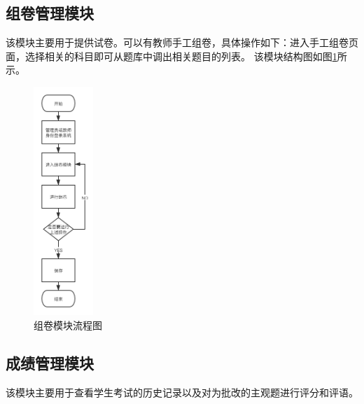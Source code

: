 \subsection{组卷管理模块}
该模块主要用于提供试卷。可以有教师手工组卷，具体操作如下：进入手工组卷页面，选择相关的科目即可从题库中调出相关题目的列表。
该模块结构图如图\ref{figure:makeup}所示。
\begin{figure}[H]
\centering
\includegraphics[width=0.2\textwidth,keepaspectratio]{data/chapter-5/makeup.png}
\caption{组卷模块流程图}
\label{figure:makeup}
\end{figure}
\subsection{成绩管理模块}
该模块主要用于查看学生考试的历史记录以及对为批改的主观题进行评分和评语。
